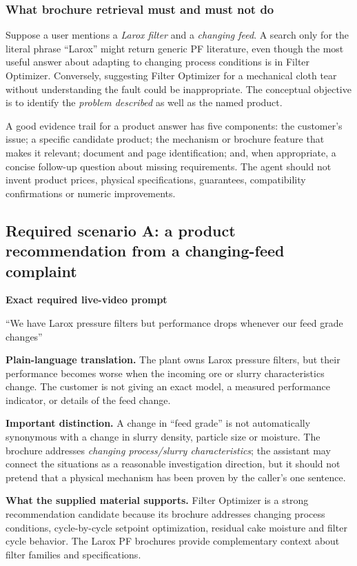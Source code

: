 \documentclass[11pt,a4paper]{article}
\begin{document}
\subsubsection{What brochure retrieval must and must not do}
Suppose a user mentions a \emph{Larox filter} and a \emph{changing feed}. A search only for the literal phrase ``Larox'' might return generic PF literature, even though the most useful answer about adapting to changing process conditions is in Filter Optimizer. Conversely, suggesting Filter Optimizer for a mechanical cloth tear without understanding the fault could be inappropriate. The conceptual objective is to identify the \emph{problem described} as well as the named product.

A good evidence trail for a product answer has five components: the customer's issue; a specific candidate product; the mechanism or brochure feature that makes it relevant; document and page identification; and, when appropriate, a concise follow-up question about missing requirements. The agent should not invent product prices, physical specifications, guarantees, compatibility confirmations or numeric improvements.

\subsection{Required scenario A: a product recommendation from a changing-feed complaint}
\begin{examplebox}
\textbf{Exact required live-video prompt}\par
``We have Larox pressure filters but performance drops whenever our feed grade changes''
\end{examplebox}
\textbf{Plain-language translation.} The plant owns Larox pressure filters, but their performance becomes worse when the incoming ore or slurry characteristics change. The customer is not giving an exact model, a measured performance indicator, or details of the feed change.

\textbf{Important distinction.} A change in ``feed grade'' is not automatically synonymous with a change in slurry density, particle size or moisture. The brochure addresses \emph{changing process/slurry characteristics}; the assistant may connect the situations as a reasonable investigation direction, but it should not pretend that a physical mechanism has been proven by the caller's one sentence.

\textbf{What the supplied material supports.} Filter Optimizer is a strong recommendation candidate because its brochure addresses changing process conditions, cycle-by-cycle setpoint optimization, residual cake moisture and filter cycle behavior. The Larox PF brochures provide complementary context about filter families and specifications.
\end{document}
